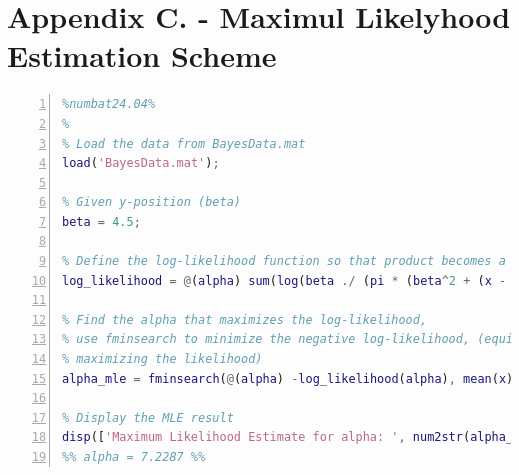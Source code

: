 \documentclass[a4paper,11pt]{article}
\begin{document}
\section{Appendix C. - Maximul Likelyhood Estimation Scheme}
\begin{lstlisting}[language=Matlab,
                   numbers=left,
                   basicstyle=\small,
                   stepnumber=1,
                   numbersep=10pt,
                   tabsize=2,
                   showspaces=false,
                   showstringspaces=false]
%%%%%%%%%Estimating alpha using Maximum Likelyhood Solution%%%%%%%%%%%%
%numbat24.04%
%
% Load the data from BayesData.mat
load('BayesData.mat');

% Given y-position (beta)
beta = 4.5;

% Define the log-likelihood function so that product becomes a sum
log_likelihood = @(alpha) sum(log(beta ./ (pi * (beta^2 + (x - alpha).^2))));

% Find the alpha that maximizes the log-likelihood, 
% use fminsearch to minimize the negative log-likelihood, (equivalent to
% maximizing the likelihood)
alpha_mle = fminsearch(@(alpha) -log_likelihood(alpha), mean(x));

% Display the MLE result
disp(['Maximum Likelihood Estimate for alpha: ', num2str(alpha_mle)]);
%% alpha = 7.2287 %%
\end{lstlisting}
\end{document}
